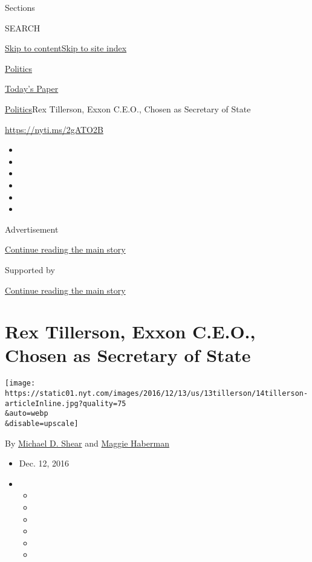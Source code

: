 Sections

SEARCH

\protect\hyperlink{site-content}{Skip to
content}\protect\hyperlink{site-index}{Skip to site index}

\href{https://www.nytimes.com/section/politics}{Politics}

\href{https://myaccount.nytimes.com/auth/login?response_type=cookie\&client_id=vi}{}

\href{https://www.nytimes.com/section/todayspaper}{Today's Paper}

\href{/section/politics}{Politics}\textbar{}Rex Tillerson, Exxon C.E.O.,
Chosen as Secretary of State

\url{https://nyti.ms/2gATO2B}

\begin{itemize}
\item
\item
\item
\item
\item
\item
\end{itemize}

Advertisement

\protect\hyperlink{after-top}{Continue reading the main story}

Supported by

\protect\hyperlink{after-sponsor}{Continue reading the main story}

\hypertarget{rex-tillerson-exxon-ceo-chosen-as-secretary-of-state}{%
\section{Rex Tillerson, Exxon C.E.O., Chosen as Secretary of
State}\label{rex-tillerson-exxon-ceo-chosen-as-secretary-of-state}}

\texttt{[image: https://static01.nyt.com/images/2016/12/13/us/13tillerson/14tillerson-articleInline.jpg?quality=75\\\&auto=webp\\\&disable=upscale]}

By \href{http://www.nytimes.com/by/michael-d-shear}{Michael D. Shear}
and \href{http://www.nytimes.com/by/maggie-haberman}{Maggie Haberman}

\begin{itemize}
\item
  Dec. 12, 2016
\item
  \begin{itemize}
  \item
  \item
  \item
  \item
  \item
  \item
  \end{itemize}
\end{itemize}

